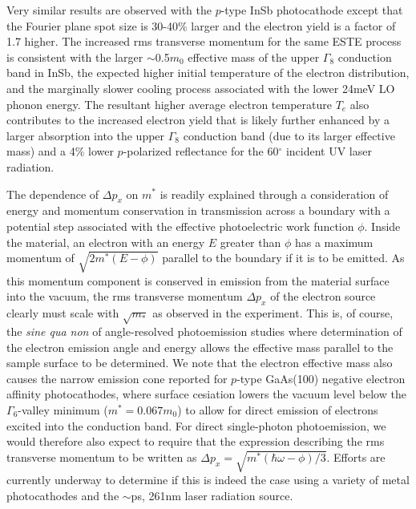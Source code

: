 Very similar results are observed with the $p$-type InSb photocathode except that the Fourier plane spot size is 30-40\%  larger and the electron yield is a factor of 1.7 higher.
The increased rms transverse momentum for the same ESTE process is consistent with the larger $\sim$0.5$m_0$ effective mass of the upper $\Gamma_8$ conduction band in InSb, the expected higher initial temperature of the electron distribution, and the marginally slower cooling process associated with the lower 24meV LO phonon energy.
The resultant higher average electron temperature $T_e$ also contributes to the increased electron yield that is likely further enhanced by a larger absorption into the upper $\Gamma_8$ conduction band (due to its larger effective mass) and a 4\% lower $p$-polarized reflectance for the 60$^{\circ}$ incident UV laser radiation\cite{aspnes_dielectric_1983}. 

The dependence of $\Delta p_x$ on $m^*$ is readily explained through a consideration of energy and momentum conservation in transmission across a boundary with a potential step associated with the effective photoelectric work function $\phi$.
Inside the material, an electron with an energy $E$ greater than $\phi$ has a maximum momentum of $\sqrt{2 m^* (E-\phi) }$ parallel to the boundary if it is to be emitted.
As this momentum component is conserved in emission from the material surface into the vacuum, the rms transverse momentum $\Delta p_x$ of the electron source clearly must scale with $\sqrt{m_*}$ as observed in the experiment.
This is, of course, the \textit{sine qua non} of angle-resolved photoemission studies\cite{himpsel_angle-resolved_1983} where determination of the electron emission angle and energy allows the effective mass parallel to the sample surface to be determined.
We note that the electron effective mass also causes the narrow emission cone reported for $p$-type GaAs(100) negative electron affinity photocathodes\cite{liu_narrow_2005}, where surface cesiation lowers the vacuum level below the $\Gamma_6$-valley minimum ($m^* = 0.067m_0$)  to allow for direct emission of electrons excited into the conduction band.
For direct single-photon photoemission, we would therefore also expect to require that the expression describing the rms transverse momentum to be written as $\Delta p_x = \sqrt{m^* ( \hbar \omega - \phi ) / 3 }$.
Efforts are currently underway to determine if this is indeed the case using a variety of metal photocathodes and the $\sim$ps, 261nm laser radiation source. 
